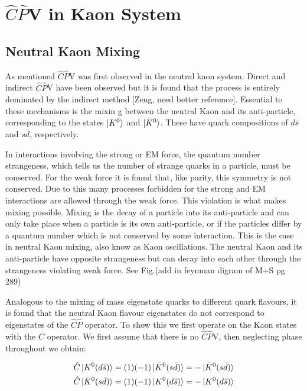 \section{$\hat{C}\hat{P}$V in Kaon System} 

\subsection{Neutral Kaon Mixing}

As mentioned $\hat{C}\hat{P}$V was first observed in the neutral kaon system. Direct and indirect $\hat{C}\hat{P}$V have been observed but it is found that the process is entirely dominated by the indirect method [Zeng, need better reference]. Essential to these mechanisms is the mixin
g between the neutral Kaon and its anti-particle, corresponding to the states $\ket{K^{0}}$ and $\ket{\bar{K}^{0}}$. These have quark compositions of $d \bar{s}$ and $s \bar{d}$, respectively. 

In interactions involving the strong or EM force, the quantum number strangeness, which tells us the number of strange quarks in a particle, must be conserved. For the weak force it is found that, like parity, this symmetry is not conserved. Due to this many processes forbidden for the strong and EM interactions are allowed through the weak force. This violation is what makes mixing possible. Mixing is the decay of a particle into its anti-particle and can only take place when a particle is its own anti-particle, or if the particles differ by a quantum number which is not conserved by some interaction. This is the case in neutral Kaon mixing, also know as Kaon oscillations. The neutral Kaon and its anti-particle have opposite strangeness but can decay into each other through the strangeness violating weak force. See Fig.(add in feynman digram of M+S pg 289) 

Analogous to the mixing of mass eigenstate quarks to different quark flavours, it is found that the neutral Kaon flavour eigenstates do not correspond to eigenstates of the $\hat{C}\hat{P}$ operator. To show this we first operate on the Kaon states with the $\hat{C}$ operator. We first assume that there is no $\hat{C}\hat{P}$V, then neglecting phase throughout we obtain:

\begin{align*}
\hat{C} \ket{K^{0}(d \bar{s})} = (1)(-1) \ket{\bar{K}^{0}(s \bar{d})} = - \ket{\bar{K}^{0}(s \bar{d})}  \\
\hat{C} \ket{\bar{K}^{0}(s \bar{d})} = (1)(-1) \ket{K^{0}(d \bar{s})} = - \ket{K^{0}(d \bar{s})}  
\end{align*}

